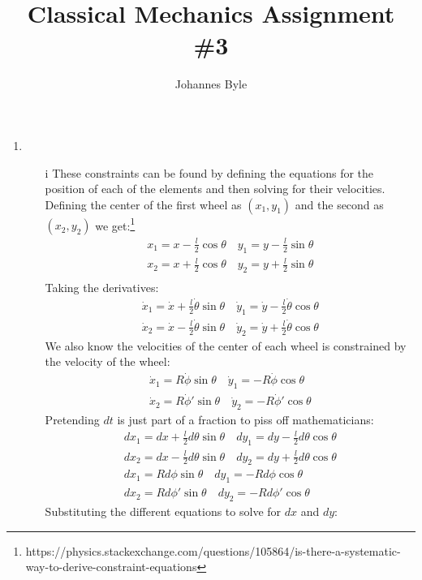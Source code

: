 \documentclass[12pt]{article}
\title{Classical Mechanics Assignment \#3}
\author{Johannes Byle}
\begin{document}
  \maketitle
  \begin{enumerate}
    \item
    \begin{enumerate}
      \item[i] These constraints can be found by defining the equations for the position of each of the elements and then solving for their velocities.
      Defining the center of the first wheel as $(x_1,y_1)$ and the second as $(x_2,y_2)$ we get:\footnote{https://physics.stackexchange.com/questions/105864/is-there-a-systematic-way-to-derive-constraint-equations}
      \begin{gather*}
        x_1=x-\frac{l}{2}\cos\theta\quad y_1=y-\frac{l}{2}\sin\theta\\
        x_2=x+\frac{l}{2}\cos\theta\quad y_2=y+\frac{l}{2}\sin\theta\\
      \end{gather*}
      Taking the derivatives:
      \begin{gather*}
        \dot{x}_1=\dot{x}+\frac{l}{2}\dot{\theta}\sin\theta\quad \dot{y}_1=\dot{y}-\frac{l}{2}\dot{\theta}\cos\theta\\
        \dot{x}_2=\dot{x}-\frac{l}{2}\dot{\theta}\sin\theta\quad \dot{y}_2=\dot{y}+\frac{l}{2}\dot{\theta}\cos\theta
      \end{gather*}
      We also know the velocities of the center of each wheel is constrained by the velocity of the wheel:
      \begin{gather*}
        \dot{x}_1=R\dot{\phi}\sin\theta\quad \dot{y}_1=-R\dot{\phi}\cos\theta\\
        \dot{x}_2=R\dot{\phi}'\sin\theta\quad \dot{y}_2=-R\dot{\phi}'\cos\theta
      \end{gather*}
      Pretending $dt$ is just part of a fraction to piss off mathematicians:
      \begin{gather*}
        dx_1=dx+\frac{l}{2}d\theta\sin\theta\quad dy_1=dy-\frac{l}{2}d\theta\cos\theta\\
        dx_2=dx-\frac{l}{2}d\theta\sin\theta\quad dy_2=dy+\frac{l}{2}d\theta\cos\theta\\
        dx_1=Rd\phi\sin\theta\quad dy_1=-Rd\phi\cos\theta\\
        dx_2=Rd\phi'\sin\theta\quad dy_2=-Rd\phi'\cos\theta
      \end{gather*}
      Substituting the different equations to solve for $dx$ and $dy$:

\end{enumerate}
\end{enumerate}
\end{document}
